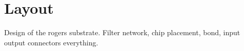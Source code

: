 \chapter{Layout}
Design of the rogers substrate. Filter network, chip placement, bond, input output connectors everything.